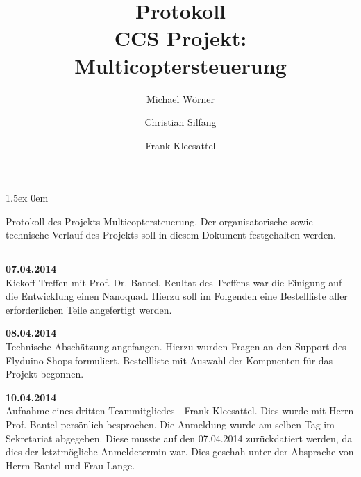 \documentclass[a4paper,12pt]{article}
\begin{document}
\title{
\textbf{Protokoll}\\
CCS Projekt: Multicoptersteuerung}
\author{Michael Wörner \and Christian Silfang \and Frank Kleesattel}
\date{}

\parskip1.5ex
\parindent0em

\maketitle

Protokoll des Projekts \glqq Multicoptersteuerung\grqq. Der organisatorische sowie technische Verlauf des Projekts soll in diesem Dokument festgehalten werden.

\noindent\rule[1ex]{\textwidth}{1pt}
\vspace{1cm}

\textbf{07.04.2014}\\
Kickoff-Treffen mit Prof. Dr. Bantel. Reultat des Treffens war die Einigung auf die Entwicklung einen Nanoquad. Hierzu soll im Folgenden eine Bestellliste aller erforderlichen Teile angefertigt werden.

\textbf{08.04.2014}\\
Technische Abschätzung angefangen. Hierzu wurden Fragen an den Support des Flyduino-Shops formuliert.
Bestellliste mit Auswahl der Kompnenten für das Projekt begonnen.

\textbf{10.04.2014}\\
Aufnahme eines dritten Teammitgliedes - Frank Kleesattel. Dies wurde mit Herrn Prof. Bantel
persönlich besprochen. Die Anmeldung wurde am selben Tag im Sekretariat abgegeben. Diese musste 
auf den 07.04.2014 zurückdatiert werden, da dies der letztmögliche Anmeldetermin war. Dies geschah
unter der Absprache von Herrn Bantel und Frau Lange.
\end{document}
